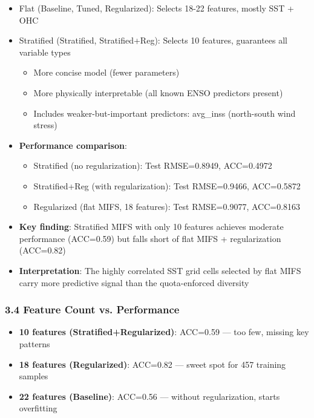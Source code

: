 \documentclass[12pt,a4paper]{article}
\begin{document}
\begin{itemize}
    \item Flat (Baseline, Tuned, Regularized): Selects 18-22 features, mostly SST + OHC
    \item Stratified (Stratified, Stratified+Reg): Selects 10 features, guarantees all variable types
    \begin{itemize}
        \item More concise model (fewer parameters)
        \item More physically interpretable (all known ENSO predictors present)
        \item Includes weaker-but-important predictors: avg\_inss (north-south wind stress)
    \end{itemize}
    \item \textbf{Performance comparison}:
    \begin{itemize}
        \item Stratified (no regularization): Test RMSE=0.8949, ACC=0.4972
        \item Stratified+Reg (with regularization): Test RMSE=0.9466, ACC=0.5872
        \item Regularized (flat MIFS, 18 features): Test RMSE=0.9077, ACC=0.8163
    \end{itemize}
    \item \textbf{Key finding}: Stratified MIFS with only 10 features achieves moderate performance (ACC=0.59) but falls short of flat MIFS + regularization (ACC=0.82)
    \item \textbf{Interpretation}: The highly correlated SST grid cells selected by flat MIFS carry more predictive signal than the quota-enforced diversity
\end{itemize}

\subsubsection*{3.4 Feature Count vs. Performance}

\begin{itemize}
    \item \textbf{10 features (Stratified+Regularized)}: ACC=0.59 — too few, missing key patterns
    \item \textbf{18 features (Regularized)}: ACC=0.82 — sweet spot for 457 training samples
    \item \textbf{22 features (Baseline)}: ACC=0.56 — without regularization, starts overfitting
\end{itemize}
\end{document}
